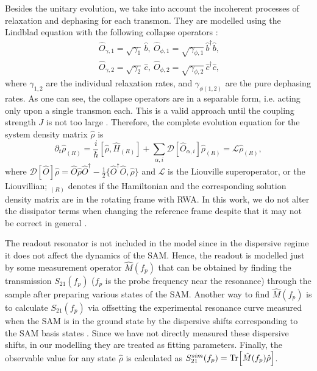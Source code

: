 \documentclass[%
 aps, prx,
 amsmath,amssymb,
 reprint,%
superscriptaddress
]{revtex4-2}
\begin{document}
Besides the unitary evolution, we take into 
account the incoherent processes of relaxation 
and dephasing for each transmon. They are 
modelled using the Lindblad equation with the 
following collapse 
operators \cite{bishop2010circuit}:
\begin{equation}\
\begin{split}
\hat{{O}}_{\gamma, 1} = \sqrt{\gamma_1}\, \hat b,\ 
\hat{{O}}_{\phi, 1} = \sqrt{\gamma_{\phi,1}}\, 
\hat b^\dag \hat b,\\
\hat{{O}}_{\gamma,2} = \sqrt{\gamma_2}\, \hat c,\ 
\hat{{O}}_{\phi,2} = \sqrt{\gamma_{ \phi,2}}\, 
\hat c^\dag \hat c,
\end{split}
\end{equation}
where $\gamma_{1,2}$ are the individual 
relaxation rates, and $\gamma_{\phi (1,2)}$ are 
the pure dephasing rates. As one can see, the 
collapse operators are in a separable form, i.e. 
acting only upon a single transmon each. This is 
a valid approach until the coupling strength $J$ 
is not too large \cite{beaudoin2011dissipation}. 
Therefore, the complete evolution equation for 
the system density matrix $\hat \rho$ is
\begin{equation}
\partial_t \hat \rho_{(R)} = \frac{i}{\hbar}[\hat 
\rho, \hat H_{(R)}] + \sum_{\alpha, i} 
\mathcal{D}[\hat{O}_{\alpha, i}] \hat \rho_{(R)} 
= \mathcal{L}\hat\rho_{(R)}, \label{eq:master}
\end{equation}
where $\mathcal{D}[\hat{{O}}]\hat \rho = 
\hat{{O}} \hat \rho \hat{{O}}^\dag - 
\frac{1}{2}\{ \hat{{O}}^\dag \hat{{O}}, \hat 
\rho\}$ and $\mathcal{L}$ is the Liouville 
superoperator, or the Liouvillian; $_{(R)}$ 
denotes if the Hamiltonian and the corresponding 
solution density matrix are in the rotating frame 
with RWA. In this work, we do not alter the 
dissipator terms when changing the reference 
frame despite that it may not be correct in 
general \cite{shavit2019bridging}.


The readout resonator is not included in the 
model since in the dispersive regime it does not 
affect the dynamics of the SAM. Hence, the 
readout is modelled just by some measurement 
operator $\hat M(f_p)$ that can be obtained by 
finding the transmission $S_{21}(f_p)$ ($f_p$ is 
the probe frequency near the resonance) through 
the sample after preparing various states of the 
SAM. Another way to find $\hat M(f_p)$ is to 
calculate $S_{21}(f_p)$ via offsetting the 
experimental resonance curve measured when the 
SAM is in the ground state by the dispersive 
shifts corresponding to the SAM basis 
states \cite{filipp2009two, chow2010detecting}. Since we have not 
directly measured these dispersive shifts, in our 
modelling they are treated as fitting parameters. 
Finally, the observable value for any state $\hat 
\rho$ is calculated as $S_{21}^{sim}(f_p) = 
\Tr[\hat M(f_p) \hat \rho]$.
\end{document}
